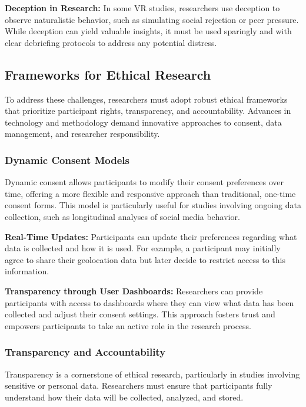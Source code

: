 \documentclass[
]{book}
\begin{document}
\textbf{Deception in Research:} In some VR studies, researchers use deception to observe naturalistic behavior, such as simulating social rejection or peer pressure. While deception can yield valuable insights, it must be used sparingly and with clear debriefing protocols to address any potential distress.

\subsection{Frameworks for Ethical Research}\label{frameworks-for-ethical-research}

To address these challenges, researchers must adopt robust ethical frameworks that prioritize participant rights, transparency, and accountability. Advances in technology and methodology demand innovative approaches to consent, data management, and researcher responsibility.

\subsubsection{Dynamic Consent Models}\label{dynamic-consent-models}

Dynamic consent allows participants to modify their consent preferences over time, offering a more flexible and responsive approach than traditional, one-time consent forms. This model is particularly useful for studies involving ongoing data collection, such as longitudinal analyses of social media behavior.

\textbf{Real-Time Updates:} Participants can update their preferences regarding what data is collected and how it is used. For example, a participant may initially agree to share their geolocation data but later decide to restrict access to this information.

\textbf{Transparency through User Dashboards:} Researchers can provide participants with access to dashboards where they can view what data has been collected and adjust their consent settings. This approach fosters trust and empowers participants to take an active role in the research process.

\subsubsection{Transparency and Accountability}\label{transparency-and-accountability}

Transparency is a cornerstone of ethical research, particularly in studies involving sensitive or personal data. Researchers must ensure that participants fully understand how their data will be collected, analyzed, and stored.
\end{document}

